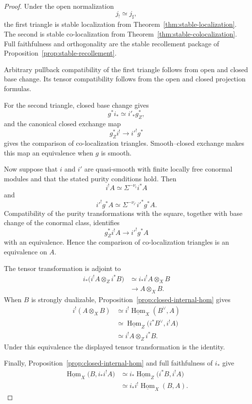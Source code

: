 \begin{proof}
Under the open normalization
\[
    j_!\simeq j_\sharp,
\]
the first triangle is stable localization from
Theorem~\ref{thm:stable-localization}.  The second is stable
co-localization from
Theorem~\ref{thm:stable-colocalization}.  Full faithfulness and
orthogonality are the stable recollement package of
Proposition~\ref{prop:stable-recollement}.

Arbitrary pullback compatibility of the first triangle follows from open
and closed base change.  Its tensor compatibility follows from the open and
closed projection formulas.

For the second triangle, closed base change gives
\[
    g^*i_*
    \simeq
    i'_*g_Z^*,
\]
and the canonical closed exchange map
\[
    g_Z^*i^!
    \longrightarrow
    i'^!g^*
\]
gives the comparison of co-localization triangles.  Smooth--closed exchange
makes this map an equivalence when \(g\) is smooth.

Now suppose that \(i\) and \(i'\) are quasi-smooth with finite locally free
conormal modules and that the stated purity conditions hold.  Then
\[
    i^!A
    \simeq
    \Sigma^{-\nu_i}i^*A
\]
and
\[
    i'^!g^*A
    \simeq
    \Sigma^{-\nu_{i'}}i'^*g^*A.
\]
Compatibility of the purity transformations with the square, together with
base change of the conormal class, identifies
\[
    g_Z^*i^!A
    \longrightarrow
    i'^!g^*A
\]
with an equivalence.  Hence the comparison of co-localization triangles is
an equivalence on \(A\).

The tensor transformation is adjoint to
\[
\begin{aligned}
    i_*
    \bigl(
      i^!A\otimes_Zi^*B
    \bigr)
    &\simeq
    i_*i^!A\otimes_XB \\
    &\longrightarrow
    A\otimes_XB.
\end{aligned}
\]
When \(B\) is strongly dualizable,
Proposition~\ref{prop:closed-internal-hom} gives
\[
\begin{aligned}
    i^!(A\otimes_XB)
    &\simeq
    i^!
    \underline{\operatorname{Hom}}_X(B^\vee,A) \\
    &\simeq
    \underline{\operatorname{Hom}}_Z
    \bigl(
      i^*B^\vee,
      i^!A
    \bigr) \\
    &\simeq
    i^!A\otimes_Zi^*B.
\end{aligned}
\]
Under this equivalence the displayed tensor transformation is the identity.

Finally,
Proposition~\ref{prop:closed-internal-hom}
and full faithfulness of \(i_*\) give
\[
\begin{aligned}
    \underline{\operatorname{Hom}}_X
    \bigl(
      B,
      i_*i^!A
    \bigr)
    &\simeq
    i_*
    \underline{\operatorname{Hom}}_Z
    \bigl(
      i^*B,
      i^!A
    \bigr) \\
    &\simeq
    i_*i^!
    \underline{\operatorname{Hom}}_X(B,A).
\end{aligned}
\]
\end{proof}

